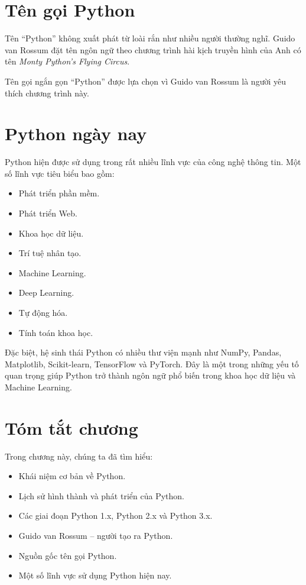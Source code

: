 \section{Tên gọi Python}

Tên ``Python'' không xuất phát từ loài rắn như nhiều người thường nghĩ.
Guido van Rossum đặt tên ngôn ngữ theo chương trình hài kịch truyền hình
của Anh có tên \textit{Monty Python's Flying Circus}.

Tên gọi ngắn gọn ``Python'' được lựa chọn vì Guido van Rossum là người
yêu thích chương trình này.

\section{Python ngày nay}

Python hiện được sử dụng trong rất nhiều lĩnh vực của công nghệ thông
tin. Một số lĩnh vực tiêu biểu bao gồm:

\begin{itemize}
    \item Phát triển phần mềm.
    \item Phát triển Web.
    \item Khoa học dữ liệu.
    \item Trí tuệ nhân tạo.
    \item Machine Learning.
    \item Deep Learning.
    \item Tự động hóa.
    \item Tính toán khoa học.
\end{itemize}

Đặc biệt, hệ sinh thái Python có nhiều thư viện mạnh như NumPy, Pandas,
Matplotlib, Scikit-learn, TensorFlow và PyTorch. Đây là một trong những
yếu tố quan trọng giúp Python trở thành ngôn ngữ phổ biến trong khoa học
dữ liệu và Machine Learning.

\section{Tóm tắt chương}

Trong chương này, chúng ta đã tìm hiểu:

\begin{itemize}
    \item Khái niệm cơ bản về Python.
    \item Lịch sử hình thành và phát triển của Python.
    \item Các giai đoạn Python 1.x, Python 2.x và Python 3.x.
    \item Guido van Rossum -- người tạo ra Python.
    \item Nguồn gốc tên gọi Python.
    \item Một số lĩnh vực sử dụng Python hiện nay.
\end{itemize}

